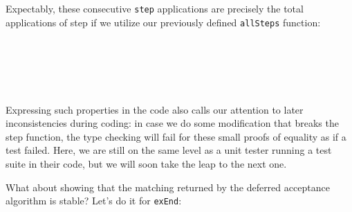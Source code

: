 {Expectably, these consecutive \texttt{step} applications are precisely the total applications of step if we utilize our previously defined \texttt{allSteps} function:

\begin{code}%
\>[0]\AgdaSpace{}%
\AgdaSymbol{:}\AgdaSpace{}%
\AgdaSpace{}%
\AgdaSpace{}%
\AgdaSpace{}%
\<%
\\
\>[0]\AgdaSpace{}%
\AgdaSymbol{=}\AgdaSpace{}%
\<%
\\
%
\\[\AgdaEmptyExtraSkip]%
\>[0]\AgdaSpace{}%
\AgdaSymbol{:}\AgdaSpace{}%
\AgdaSpace{}%
\AgdaSpace{}%
\AgdaSpace{}%
\<%
\\
\>[0]\AgdaSpace{}%
\AgdaSymbol{=}\AgdaSpace{}%
\<%
\end{code}

Expressing such properties in the code also calls our attention to later inconsistencies during coding: in case we do some modification that breaks the step function, the type checking will fail for these small proofs of equality as if a test failed. Here, we are still on the same level as a unit tester running a test suite in their code, but we will soon take the leap to the next one.

What about showing that the matching returned by the deferred acceptance algorithm is stable? Let's do it for \texttt{exEnd}:

}

